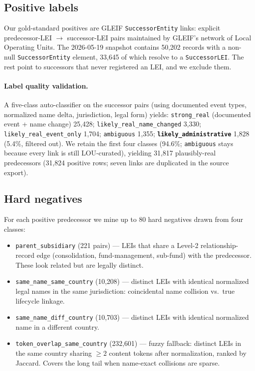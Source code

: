 \documentclass[sigconf]{acmart}
\begin{document}
\subsection{Positive labels}

Our gold-standard positives are GLEIF \texttt{SuccessorEntity}
links: explicit predecessor-LEI $\to$ successor-LEI pairs maintained
by GLEIF's network of Local Operating Units. The 2026-05-19 snapshot
contains 50{,}202 records with a non-null \texttt{SuccessorEntity}
element, 33{,}645 of which resolve to a \texttt{SuccessorLEI}. The
rest point to successors that never registered an LEI, and we
exclude them.

\paragraph{Label quality validation.} A five-class auto-classifier on
the successor pairs (using documented event types, normalized name
delta, jurisdiction, legal form) yields: \texttt{strong\_real}
(documented event + name change) 25{,}428;
\texttt{likely\_real\_name\_changed} 3{,}330;
\texttt{likely\_real\_event\_only} 1{,}704; \texttt{ambiguous}
1{,}355; \textbf{\texttt{likely\_administrative}} 1{,}828 (5.4\%,
filtered out). We retain the first four classes (94.6\%;
\texttt{ambiguous} stays because every link is still LOU-curated),
yielding 31{,}817 plausibly-real predecessors (31{,}824 positive
rows; seven links are duplicated in the source export).

\subsection{Hard negatives}

For each positive predecessor we mine up to 80 hard negatives drawn from
four classes:

\begin{itemize}
  \item \texttt{parent\_subsidiary} (221 pairs) --- LEIs that share a
        Level-2 relationship-record edge (consolidation,
        fund-management, sub-fund) with the
        predecessor. These look related but are legally distinct.
  \item \texttt{same\_name\_same\_country} (10{,}208) --- distinct LEIs with
        identical normalized legal names in the same jurisdiction:
        coincidental name collision vs.\ true lifecycle linkage.
  \item \texttt{same\_name\_diff\_country} (10{,}703) --- distinct LEIs
        with identical normalized name in a different country.
  \item \texttt{token\_overlap\_same\_country} (232{,}601) --- fuzzy
        fallback: distinct LEIs in the same country sharing $\geq 2$
        content tokens after normalization, ranked by Jaccard. Covers the
        long tail when name-exact collisions are sparse.
\end{itemize}
\end{document}
